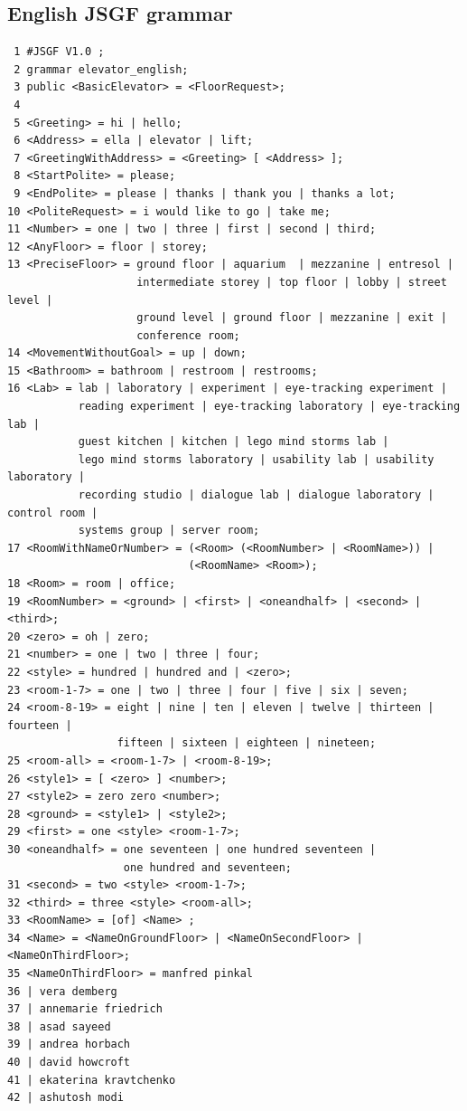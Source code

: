 \documentclass[a4paper, 12pt]{article}
\begin{document}
\subsection{English JSGF grammar}
\begin{verbatim}
 1 #JSGF V1.0 ;
 2 grammar elevator_english;
 3 public <BasicElevator> = <FloorRequest>;
 4
 5 <Greeting> = hi | hello;
 6 <Address> = ella | elevator | lift;
 7 <GreetingWithAddress> = <Greeting> [ <Address> ];
 8 <StartPolite> = please;
 9 <EndPolite> = please | thanks | thank you | thanks a lot;
10 <PoliteRequest> = i would like to go | take me;
11 <Number> = one | two | three | first | second | third;
12 <AnyFloor> = floor | storey;
13 <PreciseFloor> = ground floor | aquarium  | mezzanine | entresol |
                    intermediate storey | top floor | lobby | street level |
                    ground level | ground floor | mezzanine | exit |
                    conference room;
14 <MovementWithoutGoal> = up | down;
15 <Bathroom> = bathroom | restroom | restrooms;
16 <Lab> = lab | laboratory | experiment | eye-tracking experiment |
           reading experiment | eye-tracking laboratory | eye-tracking lab |
           guest kitchen | kitchen | lego mind storms lab |
           lego mind storms laboratory | usability lab | usability laboratory |
           recording studio | dialogue lab | dialogue laboratory | control room |
           systems group | server room;
17 <RoomWithNameOrNumber> = (<Room> (<RoomNumber> | <RoomName>)) |
                            (<RoomName> <Room>);
18 <Room> = room | office;
19 <RoomNumber> = <ground> | <first> | <oneandhalf> | <second> | <third>;
20 <zero> = oh | zero;
21 <number> = one | two | three | four;
22 <style> = hundred | hundred and | <zero>;
23 <room-1-7> = one | two | three | four | five | six | seven;
24 <room-8-19> = eight | nine | ten | eleven | twelve | thirteen | fourteen |
                 fifteen | sixteen | eighteen | nineteen;
25 <room-all> = <room-1-7> | <room-8-19>;
26 <style1> = [ <zero> ] <number>;
27 <style2> = zero zero <number>;
28 <ground> = <style1> | <style2>;
29 <first> = one <style> <room-1-7>;
30 <oneandhalf> = one seventeen | one hundred seventeen |
                  one hundred and seventeen;
31 <second> = two <style> <room-1-7>;
32 <third> = three <style> <room-all>;
33 <RoomName> = [of] <Name> ;
34 <Name> = <NameOnGroundFloor> | <NameOnSecondFloor> | <NameOnThirdFloor>;
35 <NameOnThirdFloor> = manfred pinkal
36 | vera demberg
37 | annemarie friedrich
38 | asad sayeed
39 | andrea horbach
40 | david howcroft
41 | ekaterina kravtchenko
42 | ashutosh modi

\end{verbatim}
\end{document}
